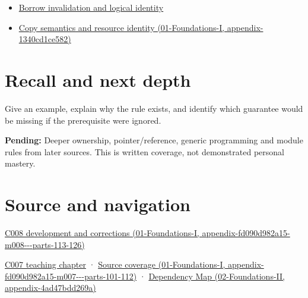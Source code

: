 \begin{itemize}
\tightlist
\item
  \hyperref[appendix-f9b8b9188c7f]{Borrow invalidation and logical identity}
\item
  \href{../01-Foundations-I/main.pdf\#nameddest=appendix-1340cd1ce582}{Copy semantics and resource identity (01-Foundations-I, appendix-1340cd1ce582)}
\end{itemize}

\section{Recall and next depth}\label{appendix-f1581457d322-recall-and-next-depth}

Give an example, explain why the rule exists, and identify which guarantee would be missing if the prerequisite were ignored.

\textbf{Pending:} Deeper ownership, pointer/reference, generic programming and module rules from later sources. This is written coverage, not demonstrated personal mastery.

\section{Source and navigation}\label{appendix-f1581457d322-source-and-navigation}

\href{../01-Foundations-I/main.pdf\#nameddest=appendix-fd090d982a15-m008---parts-113-126}{C008 development and corrections (01-Foundations-I, appendix-fd090d982a15-m008-\/-\/-parts-113-126)}

\href{Continuous\%20Notes/Computing\%20Foundations\%20-\%20From\%20Bits\%20to\%20C++\%20and\%20Systems\%20APIs\#Values,\%20occupants\%20and\%20addresses\%20tell\%20different\%20stories}{C007 teaching chapter} · \href{../01-Foundations-I/main.pdf\#nameddest=appendix-fd090d982a15-m007---parts-101-112}{Source coverage (01-Foundations-I, appendix-fd090d982a15-m007-\/-\/-parts-101-112)} · \href{../02-Foundations-II/main.pdf\#nameddest=appendix-4ad47bdd269a}{Dependency Map (02-Foundations-II, appendix-4ad47bdd269a)}
